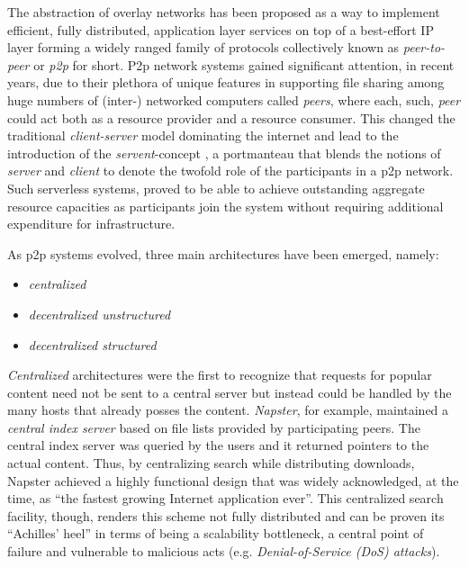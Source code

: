 \documentclass[acmcsur]{acmtrans2m}
\begin{document}
The abstraction of overlay networks has been proposed as a way to implement
efficient, fully distributed, application layer services on top of a best-effort
IP layer forming a widely ranged family of protocols collectively known as
\emph{peer-to-peer} or \emph{p2p} for short. P2p network systems gained
significant attention, in recent years, due to their plethora of unique features
in supporting file sharing among huge numbers of (inter-) networked computers
called \emph{peers}, where each, such, \emph{peer} could act both as a resource
provider and a resource consumer. This changed the traditional
\emph{client-server} model dominating the internet and lead to the introduction
of the \emph{servent}-concept \cite{gnutella}, a portmanteau that blends the
notions of \emph{server} and \emph{client} to denote the twofold role of the
participants in a p2p network. Such serverless systems, proved to be able to
achieve outstanding aggregate resource capacities as participants join the
system
without requiring additional expenditure for infrastructure.


As p2p systems evolved, three main architectures have been emerged, namely:
\begin{itemize}
  \item \emph{centralized}
  \item \emph{decentralized unstructured}
  \item \emph{decentralized structured}
\end{itemize}

\emph{Centralized} architectures were the first to recognize that requests for popular content need not be sent to a central server but instead could be handled by the many hosts that already posses the content. \emph{Napster}, for example, maintained a \emph{central index server} based on file lists provided by participating peers. The central index server was queried by the users and it returned pointers to the actual content. Thus, by centralizing search while distributing downloads, Napster achieved a highly functional design that was widely acknowledged, at the time, as ``the fastest growing Internet application ever''. This centralized search facility, though, renders this scheme not fully distributed and can be proven its ``Achilles' heel'' in terms of being a scalability bottleneck, a central point of failure and vulnerable to malicious acts (e.g. \emph{Denial-of-Service (DoS) attacks}).
\end{document}
